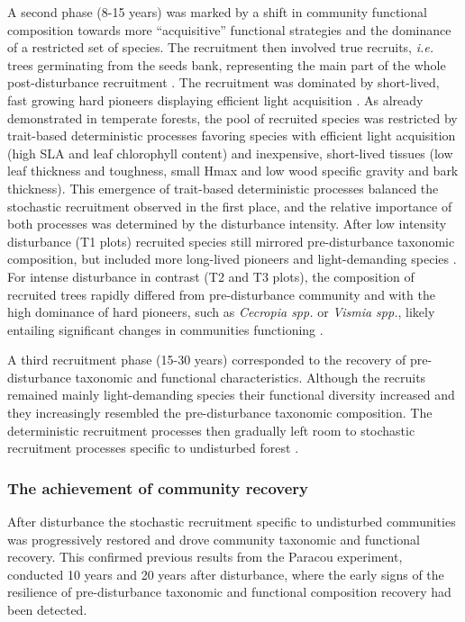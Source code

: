 \documentclass[
  11pt,
  french,
  A4paper,
  extrafontsizes,onecolumn,openright
  ]{memoir}
\begin{document}
A second phase (8-15 years) was marked by a shift in community
functional composition towards more ``acquisitive'' functional
strategies and the dominance of a restricted set of species. The
recruitment then involved true recruits, \emph{i.e.} trees germinating
from the seeds bank, representing the main part of the whole
post-disturbance recruitment \autocite{Lawton1988}. The recruitment was
dominated by short-lived, fast growing hard pioneers displaying
efficient light acquisition
\autocites{Wright2004}{Chave2009b}{Herault2011}. As already demonstrated
in temperate forests, the pool of recruited species was restricted by
trait-based deterministic processes favoring species with efficient
light acquisition (high SLA and leaf chlorophyll content) and
inexpensive, short-lived tissues (low leaf thickness and toughness,
small Hmax and low wood specific gravity and bark
thickness)\autocites{Chave2004}{Kunstler2016}. This emergence of
trait-based deterministic processes balanced the stochastic recruitment
observed in the first place, and the relative importance of both
processes was determined by the disturbance intensity. After low
intensity disturbance (T1 plots) recruited species still mirrored
pre-disturbance taxonomic composition, but included more long-lived
pioneers and light-demanding species \autocite{Bongers2009}. For intense
disturbance in contrast (T2 and T3 plots), the composition of recruited
trees rapidly differed from pre-disturbance community and with the high
dominance of hard pioneers, such as \emph{Cecropia spp.} or \emph{Vismia
spp.}, likely entailing significant changes in communities functioning
\autocite{Diaz2005}.

A third recruitment phase (15-30 years) corresponded to the recovery of
pre-disturbance taxonomic and functional characteristics. Although the
recruits remained mainly light-demanding species their functional
diversity increased and they increasingly resembled the pre-disturbance
taxonomic composition. The deterministic recruitment processes then
gradually left room to stochastic recruitment processes specific to
undisturbed forest \autocites{Lawton1988}{Chave2004}.

\subsubsection{The achievement of community
recovery}\label{the-achievement-of-community-recovery}

After disturbance the stochastic recruitment specific to undisturbed
communities was progressively restored and drove community taxonomic and
functional recovery. This confirmed previous results from the Paracou
experiment, conducted 10 years \autocite{Molino2001} and 20 years
\autocite{Baraloto2012a} after disturbance, where the early signs of the
resilience of pre-disturbance taxonomic and functional composition
recovery had been detected.
\end{document}
